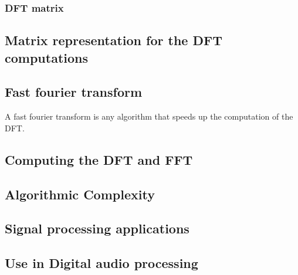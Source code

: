 \subsubsection{DFT matrix}

\subsection{Matrix representation for the DFT computations}
\subsection{Fast fourier transform}
A fast fourier transform is any algorithm that speeds up the computation of the DFT.
\subsection{Computing the DFT and FFT}
\subsection{Algorithmic Complexity}

\subsection{Signal processing applications}

\subsection{Use in Digital audio processing}

